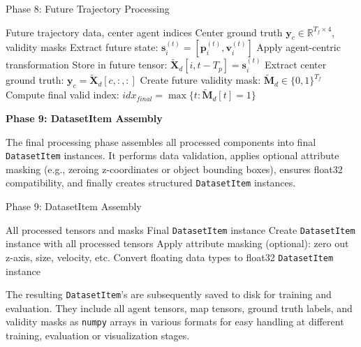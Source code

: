 \begin{algorithm}[H]
\caption{Phase 8: Future Trajectory Processing}
\label{alg:phase8_future}
\begin{algorithmic}[1]
\REQUIRE Future trajectory data, center agent indices
\ENSURE Center ground truth \(\boldsymbol{y}_c \in \mathbb{R}^{T_f \times 4}\), validity masks
\FOR{each agent \(i\), future timestep \(t \in [T_p, T_p + T_f)\)}
    \STATE Extract future state: \(\boldsymbol{s}_i^{(t)} = [\boldsymbol{p}_i^{(t)}, \boldsymbol{v}_i^{(t)}]\)
    \STATE Apply agent-centric transformation
    \STATE Store in future tensor: \(\tilde{\boldsymbol{X}}_d[i, t-T_p] = \boldsymbol{s}_i^{(t)}\)
\ENDFOR
{}
    \STATE Extract center ground truth: \(\boldsymbol{y}_c = \tilde{\boldsymbol{X}}_d[c, :, :]\)
    \STATE Create future validity mask: \(\tilde{\boldsymbol{M}}_d \in \{0,1\}^{T_f}\)
    \STATE Compute final valid index: \(idx_{final} = \max\{t : \tilde{\boldsymbol{M}}_d[t] = 1\}\)
\ENDFOR
\end{algorithmic}
\end{algorithm}

\textbf{Phase 9: DatasetItem Assembly}

The final processing phase assembles all processed components into final \texttt{DatasetItem} instances. It performs data validation, applies optional attribute masking (e.g., zeroing z-coordinates or object bounding boxes), ensures float32 compatibility, and finally creates structured \texttt{DatasetItem} instances.
\begin{algorithm}[H]
\caption{Phase 9: DatasetItem Assembly}
\label{alg:phase9_assembly}
\begin{algorithmic}[1]
\REQUIRE All processed tensors and masks
\ENSURE Final \texttt{DatasetItem} instance
\STATE Create \texttt{DatasetItem} instance with all processed tensors
\STATE Apply attribute masking (optional): zero out z-axis, size, velocity, etc.
\STATE Convert floating data types to float32
\RETURN \texttt{DatasetItem} instance
\end{algorithmic}
\end{algorithm}

The resulting \texttt{DatasetItem}'s are subsequently saved to disk for training and evaluation. They include all agent tensors, map tensors, ground truth labels, and validity masks as \texttt{numpy} arrays in various formats for easy handling at different training, evaluation or visualization stages.


% 

